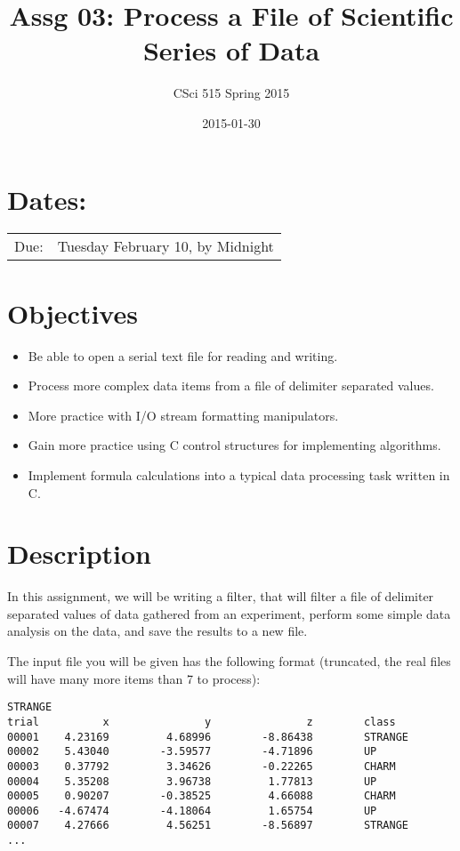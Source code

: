 \documentclass[11pt]{article}
\title{Assg 03: Process a File of Scientific Series of Data}
\author{CSci 515 Spring 2015}
\date{2015-01-30}
\begin{document}
\maketitle


\section*{Dates:}
\label{sec-1}


\begin{center}
\begin{tabular}{ll}
 Due:  &  Tuesday February 10, by Midnight  \\
\end{tabular}
\end{center}
\section*{Objectives}
\label{sec-2}

\begin{itemize}
\item Be able to open a serial text file for reading and writing.
\item Process more complex data items from a file of delimiter separated values.
\item More practice with I/O stream formatting manipulators.
\item Gain more practice using C control structures for implementing
  algorithms.
\item Implement formula calculations into a typical data processing task
  written in C.
\end{itemize}
\section*{Description}
\label{sec-3}

In this assignment, we will be writing a filter, that will filter a file of
delimiter separated values of data gathered from an experiment, perform
some simple data analysis on the data, and save the results to a new file.

The input file you will be given has the following format (truncated,
the real files will have many more items than 7 to process):


\begin{verbatim}
STRANGE
trial          x               y               z        class
00001    4.23169         4.68996        -8.86438        STRANGE
00002    5.43040        -3.59577        -4.71896        UP
00003    0.37792         3.34626        -0.22265        CHARM
00004    5.35208         3.96738         1.77813        UP
00005    0.90207        -0.38525         4.66088        CHARM
00006   -4.67474        -4.18064         1.65754        UP
00007    4.27666         4.56251        -8.56897        STRANGE
...
\end{verbatim}
\end{document}
